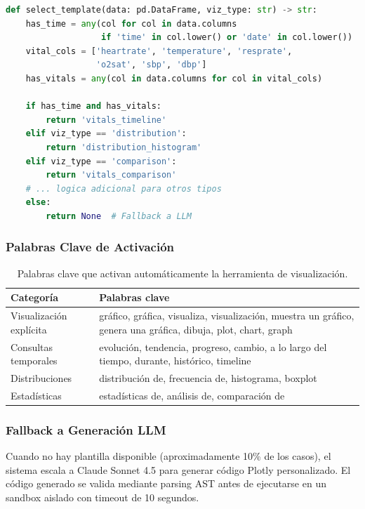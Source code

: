 \begin{lstlisting}[language=Python, basicstyle=\tiny\ttfamily, backgroundcolor=\color{codebg}]
def select_template(data: pd.DataFrame, viz_type: str) -> str:
    has_time = any(col for col in data.columns 
                   if 'time' in col.lower() or 'date' in col.lower())
    vital_cols = ['heartrate', 'temperature', 'resprate', 
                  'o2sat', 'sbp', 'dbp']
    has_vitals = any(col in data.columns for col in vital_cols)
    
    if has_time and has_vitals:
        return 'vitals_timeline'
    elif viz_type == 'distribution':
        return 'distribution_histogram'
    elif viz_type == 'comparison':
        return 'vitals_comparison'
    # ... logica adicional para otros tipos
    else:
        return None  # Fallback a LLM
\end{lstlisting}

\subsubsection{Palabras Clave de Activación}

\begin{table}[H]
\centering
\caption{Palabras clave que activan automáticamente la herramienta de visualización.}
\label{tab:appendix_vizkeywords}
\footnotesize
\begin{tabularx}{\columnwidth}{lX}
\toprule
\textbf{Categoría} & \textbf{Palabras clave} \\
\midrule
Visualización explícita & gráfico, gráfica, visualiza, visualización, muestra un gráfico, genera una gráfica, dibuja, plot, chart, graph \\
Consultas temporales & evolución, tendencia, progreso, cambio, a lo largo del tiempo, durante, histórico, timeline \\
Distribuciones & distribución de, frecuencia de, histograma, boxplot \\
Estadísticas & estadísticas de, análisis de, comparación de \\
\bottomrule
\end{tabularx}
\end{table}

\subsubsection{Fallback a Generación LLM}

Cuando no hay plantilla disponible (aproximadamente 10\% de los casos), el sistema escala a Claude Sonnet 4.5 para generar código Plotly personalizado. El código generado se valida mediante parsing \ac{AST} antes de ejecutarse en un sandbox aislado con timeout de 10 segundos.

